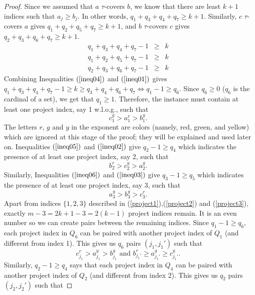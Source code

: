 \documentclass{article}
\begin{document}
\begin{proof}
Since we assumed that $a$ $\tau$-covers $b$, we know that there are least $k+1$ indices such that $a_j \ge b_j$. 
In other words, $q_1+q_3+q_4+q_7 \ge k+1$. Similarly,
$c$ $\tau$-covers $a$ gives $q_1+q_2+q_5+q_7 \ge k+1$, and 
$b$ $\tau$-covers $c$ gives $q_2+q_3+q_6+q_7 \ge k+1$.
\begin{eqnarray} \label{ineq04}
q_1+q_3+q_4+q_7-1 &\ge& k\\ \label{ineq05}
q_1+q_2+q_5+q_7-1&\ge& k\\ \label{ineq06}
q_2+q_3+q_6+q_7-1 &\ge& k
\end{eqnarray}
Combining Inequalities $(\ref{ineq04})$ and $(\ref{ineq01})$ gives 
$q_1+q_3+q_4+q_7-1 \ge k \ge q_3+q_4+q_6+q_7 \Leftrightarrow 
q_1-1\ge q_6$. Since $q_6 \ge 0$ ($q_6$ is the cardinal of a set), we get that $q_1 \ge 1$. Therefore, the instance must contain at least one project index, say 1 w.l.o.g., such that 
\begin{equation} \label{project1}
c_1^g > a_1^r > b_1^y.
\end{equation}
The letters $r$, $g$ and $y$ in the exponent are colors (namely, red, green, and yellow) which are ignored at this stage of the proof; they will be explained and used later on. 
Inequalities $(\ref{ineq05})$ and $(\ref{ineq02})$ give $q_2 -1 \ge q_4$ which indicates the presence of at least one project index, say 2, such that 
\begin{equation} \label{project2}
b_2^r > c_2^y > a_2^g.
\end{equation}
Similarly, Inequalities $(\ref{ineq06})$ and $(\ref{ineq03})$ give $q_3 -1 \ge q_5$ which indicates the presence of at least one project index, say 3, such that 
\begin{equation} \label{project3}
a_3^y > b_3^g > c_3^r.
\end{equation}
Apart from indices $\{1,2,3\}$ described in (\ref{project1}),(\ref{project2}) and (\ref{project3}),  exactly $m-3=2k+1-3=2(k-1)$  project indices remain. It is an even number so we can create pairs between the remaining indices. Since $q_1-1 \ge q_6$, each project index in $Q_6$ can be paired with another project index of $Q_1$ (and different from index 1). This gives us $q_6$ pairs $(j_1,j_1')$ such that 
\begin{equation} \label{project16}
c^r_{j_1} > a^y_{j_1} > b^g_{j_1} \text{ and }
b^r_{{j_1}'} \ge a^g_{{j_1}'} \ge c^y_{{j_1}'}.
\end{equation}
Similarly, $q_2-1 \ge q_4$ says that each project index in $Q_4$ can be paired with another project index of $Q_2$ (and different from index 2). This gives us $q_2$ pairs $({j_2},{j_2}')$ such that 

\end{proof}
\end{document}
